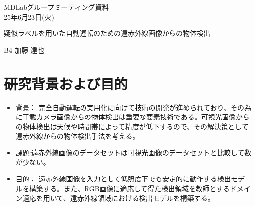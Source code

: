 \documentclass[a4j]{jarticle}
\begin{document}
	\begin{flushright}
		MDLabグループミーティング資料\\
		25年6月23日(火)
	\end{flushright}

	\begin{center}
		{\Large	疑似ラベルを用いた自動運転のための遠赤外線画像からの物体検出}
	\end{center}

	\begin{flushright}
		{\large B4 加藤 達也}
	\end{flushright}

	\section{研究背景および目的}
	\begin{itemize}
		\item 背景： 完全自動運転の実用化に向けて技術の開発が進められており、その為に車載カメラ画像からの物体検出は重要な要素技術である。可視光画像からの物体検出は天候や時間帯によって精度が低下するので、その解決策として遠赤外線からの物体検出手法を考える。
		\item 課題:遠赤外線画像のデータセットは可視光画像のデータセットと比較して数が少ない。
		\item 目的： 遠赤外線画像を入力として低照度下でも安定的に動作する検出モデルを構築する。また、RGB画像に適応して得た検出領域を教師とするドメイン適応を用いて、遠赤外線領域における検出モデルを構築する。
	\end{itemize}
\end{document}
